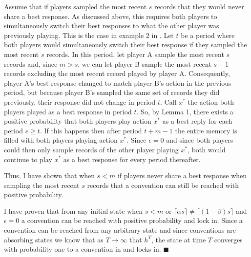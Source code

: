 \documentclass[12pt]{article}
\begin{document}
Assume that if players sampled the most recent $s$ records that they would never share a best response. As discussed above, this requires both players to simultaneously switch their best responses to what the other player was previously playing. This is the case in example 2 in \cite{young1993evolution}. Let $t$ be a period where both players would simultaneously switch their best response if they sampled the most recent $s$ records. In this period, let player A sample the most recent $s$ records and, since $m > s$, we can let player B sample the most recent $s+1$ records excluding the most recent record played by player A. Consequently, player A's best response changed to match player B's action in the previous period, but because player B's sampled the same set of records they did previously, their response did not change in period $t$. Call $x^*$ the action both players played as a best response in period $t$. So, by Lemma 1, there exists a positive probability that both players play action $x^*$ as a best reply for each period $e \geq t$. If this happens then after period $t+m-1$ the entire memory is filled with both players playing action $x^*$. Since $\epsilon=0$ and since both players could then only sample records of the other player playing $x^*$, both would continue to play $x^*$ as a best response for every period thereafter.

\vskip6pt

Thus, I have shown that when $s < m$ if players never share a best response when sampling the most recent $s$ records that a convention can still be reached with positive probability.

\vskip12pt

I have proven that from any initial state when $s < m$ or $\lceil \alpha s \rceil \neq \lceil (1-\beta) s \rceil$ and $\epsilon=0$ a convention can be reached with positive probability and lock in. Since a convention can be reached from any arbitrary state and since conventions are absorbing states we know that as $T \rightarrow \infty$ that $h^T$, the state at time $T$ converges with probability one to a convention in and locks in. $\blacksquare$

\newpage



\end{document}
